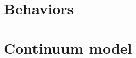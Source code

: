 \documentclass{article}
\begin{document}

\section{Behaviors}

\section{Continuum model}




\end{document}
